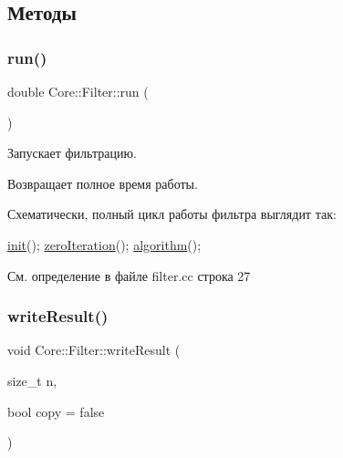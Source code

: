 \subsection{Методы}
\hypertarget{class_core_1_1_filter_ad5070e695763edc66d211651b98c09f1}{}\label{class_core_1_1_filter_ad5070e695763edc66d211651b98c09f1} 
\subsubsection{\texorpdfstring{run()}{run()}}
{\footnotesize\ttfamily double Core\+::\+Filter\+::run (\begin{DoxyParamCaption}{ }\end{DoxyParamCaption})}



Запускает фильтрацию. 

\begin{DoxyReturn}{Возвращает}
полное время работы.
\end{DoxyReturn}
Схематически, полный цикл работы фильтра выглядит так\+: 
\begin{DoxyCode}
\hyperlink{class_core_1_1_filter_ae8bb3b004400941317a1e9fdc1ca2c58}{init}();
\hyperlink{class_core_1_1_filter_af95880b734c4b8dc3d8c02f222b32506}{zeroIteration}();
\hyperlink{class_core_1_1_filter_a438681ee3e54aba2148042d9f8011ab8}{algorithm}();
\end{DoxyCode}
 

См. определение в файле filter.\+cc строка 27

\hypertarget{class_core_1_1_filter_a84c7d1ebe3931974c3beccf27f13c1c5}{}\label{class_core_1_1_filter_a84c7d1ebe3931974c3beccf27f13c1c5} 
\subsubsection{\texorpdfstring{write\+Result()}{writeResult()}}
{\footnotesize\ttfamily void Core\+::\+Filter\+::write\+Result (\begin{DoxyParamCaption}\item[{size\+\_\+t}]{n,  }\item[{bool}]{copy = {\ttfamily false} }\end{DoxyParamCaption})\hspace{0.3cm}{\ttfamily [protected]}}



